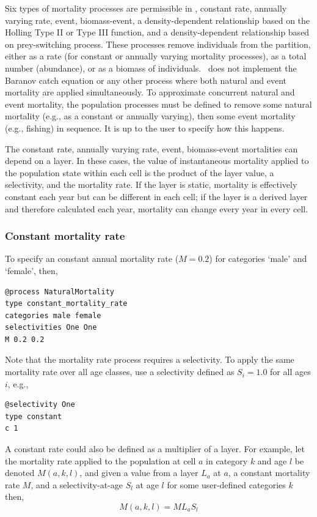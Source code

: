Six types of mortality processes are permissible in \SPM, constant rate, annually varying rate, event, biomass-event, a density-dependent relationship based on the Holling \citep{Holling1959} Type II or Type III function, and a density-dependent relationship based on prey-switching process. These processes remove individuals from the partition, either as a rate (for constant or annually varying mortality processes), as a total number (abundance), or as a biomass of individuals. \SPM\ does not implement the Baranov catch equation or any other process where both natural and event mortality are applied simultaneously. To approximate concurrent natural and event mortality, the population processes must be defined to remove some natural mortality (e.g., as a constant or annually varying), then some event mortality (e.g., fishing) in sequence. It is up to the user to specify how this happens.

The constant rate, annually varying rate, event, biomass-event mortalities can depend on a layer. In these cases, the value of instantaneous mortality applied to the population state within each cell is the product of the layer value, a selectivity, and the mortality rate. If the layer is static, mortality is effectively constant each year but can be different in each cell; if the layer is a derived layer and therefore calculated each year, mortality can change every year in every cell.  

\subsubsection*{Constant mortality rate}

To specify an constant annual mortality rate ($M=0.2$) for categories `male' and `female', then, 

{\small{\begin{verbatim}
@process NaturalMortality
type constant_mortality_rate
categories male female
selectivities One One
M 0.2 0.2
\end{verbatim}}}

Note that the mortality rate process requires a selectivity. To apply the same mortality rate over all age classes, use a selectivity defined as $S_i=1.0$ for all ages $i$, e.g.,

{\small{\begin{verbatim}
@selectivity One
type constant
c 1
\end{verbatim}}}

A constant rate could also be defined as a multiplier of a layer. For example, let the mortality rate applied to the population at cell $a$ in category $k$ and age $l$ be denoted $M(a,k,l)$, and given a value from a layer $L_a$  at $a$, a constant mortality rate $M$, and a selectivity-at-age $S_l$ at age $l$ for some user-defined categories $k$ then, 
\begin{equation}
  M(a,k,l) = ML_a S_l 
\end{equation}

